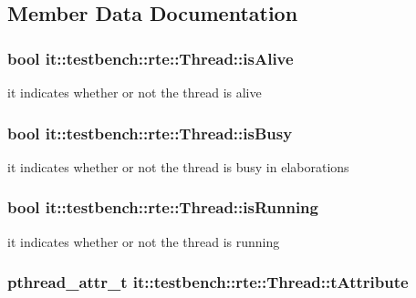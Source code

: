 \subsection{Member Data Documentation}
\hypertarget{classit_1_1testbench_1_1rte_1_1Thread_aab48976fffdc87659876c6e4661715ad}{
\subsubsection[{is\-Alive}]{\setlength{\rightskip}{0pt plus 5cm}bool it\-::testbench\-::rte\-::\-Thread\-::is\-Alive\hspace{0.3cm}{\ttfamily [protected]}}}\label{df/df6/classit_1_1testbench_1_1rte_1_1Thread_aab48976fffdc87659876c6e4661715ad}
it indicates whether or not the thread is alive \hypertarget{classit_1_1testbench_1_1rte_1_1Thread_a66f2d3623fbaaebf8aea079fb509ef7e}{
\subsubsection[{is\-Busy}]{\setlength{\rightskip}{0pt plus 5cm}bool it\-::testbench\-::rte\-::\-Thread\-::is\-Busy\hspace{0.3cm}{\ttfamily [protected]}}}\label{df/df6/classit_1_1testbench_1_1rte_1_1Thread_a66f2d3623fbaaebf8aea079fb509ef7e}
it indicates whether or not the thread is busy in elaborations \hypertarget{classit_1_1testbench_1_1rte_1_1Thread_a2011457d637ada9026f8ab2c2ca14763}{
\subsubsection[{is\-Running}]{\setlength{\rightskip}{0pt plus 5cm}bool it\-::testbench\-::rte\-::\-Thread\-::is\-Running\hspace{0.3cm}{\ttfamily [protected]}}}\label{df/df6/classit_1_1testbench_1_1rte_1_1Thread_a2011457d637ada9026f8ab2c2ca14763}
it indicates whether or not the thread is running \hypertarget{classit_1_1testbench_1_1rte_1_1Thread_a564b0b9b90d76effbcdc6164e5d1a8d6}{
\subsubsection[{t\-Attribute}]{\setlength{\rightskip}{0pt plus 5cm}pthread\-\_\-attr\-\_\-t it\-::testbench\-::rte\-::\-Thread\-::t\-Attribute\hspace{0.3cm}{\ttfamily [protected]}}}\label{df/df6/classit_1_1testbench_1_1rte_1_1Thread_a564b0b9b90d76effbcdc6164e5d1a8d6}
